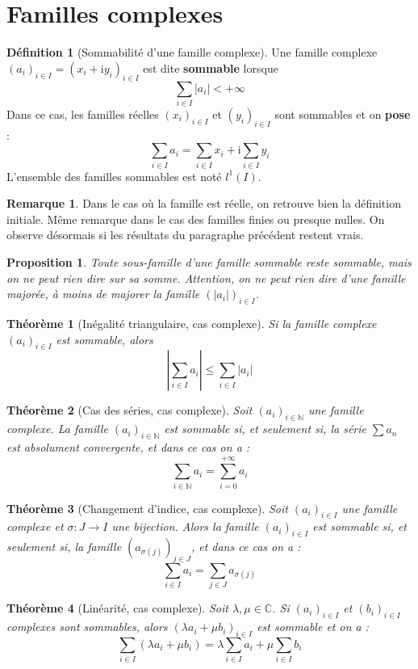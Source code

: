 \documentclass[french]{book}
\newcommand{\N}{\mathbb{N}}
\newcommand{\C}{\mathbb{C}}
\theoremstyle{plain}
\newtheorem{thm}{Théorème}[chapter]
\newtheorem{prop}{Proposition}[chapter]
\theoremstyle{definition}
\newtheorem{dfn}{Définition}[chapter]
\newtheorem{rmq}{Remarque}[chapter]
\theoremstyle{remark}
\begin{document}
\section{Familles complexes}
\begin{dfn}[Sommabilité d'une famille complexe]
	Une famille complexe $(a_i)_{i\in I}=(x_i+\text{i}y_i)_{i\in I}$ est dite \textbf{sommable} lorsque $$\sum_{i\in I}\lvert a_i\rvert <+\infty$$ Dans ce cas, les familles réelles $(x_i)_{i\in I}$ et $(y_i)_{i\in I}$ sont sommables et on \textbf{pose} : $$\sum_{i\in I}a_i=\sum_{i\in I}x_i +\text{i}\sum_{i\in I}y_i$$ L'ensemble des familles sommables est noté $l^1(I)$.
\end{dfn}
\begin{rmq} Dans le cas où la famille est réelle, on retrouve bien la définition initiale. Même remarque dans le cas des familles finies ou presque nulles.
	On observe désormais si les résultats du paragraphe précédent restent vrais. \end{rmq}
\begin{prop}
	Toute sous-famille d'une famille sommable reste sommable, mais on ne peut rien dire sur sa somme. Attention, on ne peut rien dire d'une famille majorée, à moins de majorer la famille $(\lvert a_i\rvert)_{i\in I}$.
\end{prop}
\begin{thm}[Inégalité triangulaire, cas complexe]
	Si la famille complexe $(a_i)_{i\in I}$ est sommable, alors $$\left\lvert\sum_{i\in I}a_i\right\rvert \leqslant\sum_{i\in I}\lvert a_i\rvert$$
\end{thm}
\begin{thm}[Cas des séries, cas complexe]
	Soit $(a_i)_{i\in\N}$ une famille complexe. La famille $(a_i)_{i\in\N}$ est sommable si, et seulement si, la série $\displaystyle \sum a_n$ est absolument convergente, et dans ce cas on a : $$\sum_{i\in\N}a_i=\sum_{i=0}^{+\infty}a_i$$
\end{thm}
\begin{thm}[Changement d'indice, cas complexe]
	Soit $(a_i)_{i\in I}$ une famille complexe et $\sigma:J\rightarrow I$ une bijection. Alors la famille $(a_i)_{i\in I}$ est sommable si, et seulement si, la famille $(a_{\sigma(j)})_{j\in J}$, et dans ce cas on a : $$\sum_{i\in I}a_i=\sum_{j\in J}a_{\sigma(j)}$$
\end{thm}
\begin{thm}[Linéarité, cas complexe]
	Soit $\lambda,\mu\in\C$. Si $(a_i)_{i\in I}$ et $(b_i)_{i\in I}$ complexes sont sommables, alors $(\lambda a_i+\mu b_i)_{i\in I}$ est sommable et on a : $$\sum_{i\in I}(\lambda a_i+\mu b_i)=\lambda\sum_{i\in I}a_i+\mu\sum_{i\in I}b_i$$
\end{thm}
\end{document}
